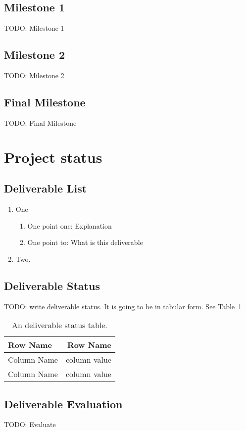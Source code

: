 \documentclass[a4paper]{article}
\begin{document}
\subsection{Milestone 1}
TODO: Milestone 1
\subsection{Milestone 2}
TODO: Milestone 2
\subsection{Final Milestone}
TODO: Final Milestone

\section{Project status}
\subsection{Deliverable List}

\begin{enumerate}
\item One
  \begin{enumerate}
  \item One point one: Explanation
  \item One point to: What is this deliverable
  \end{enumerate}
\item Two.
\end{enumerate}

\subsection{Deliverable Status}
TODO: write deliverable status. It is going to be in tabular form. See Table~\ref{tab:deliverablestatus}

\begin{table}
\centering
\begin{tabular}{l|r}
Row Name & Row Name \\\hline
Column Name & column value \\
Column Name & column value
\end{tabular}
\caption{\label{tab:deliverablestatus}An deliverable status table.}
\end{table}

\subsection{Deliverable Evaluation}
TODO: Evaluate
\end{document}
